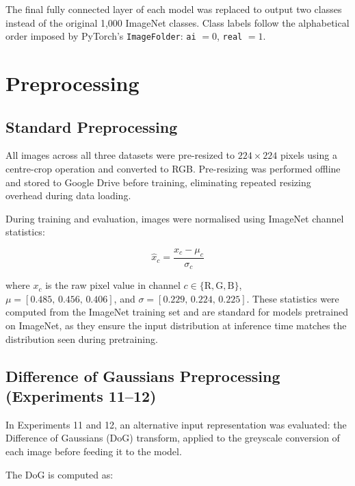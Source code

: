 The final fully connected layer of each model was replaced to output two classes instead of the
original 1,000 ImageNet classes. Class labels follow the alphabetical order imposed by PyTorch's
\texttt{ImageFolder}: \texttt{ai} $= 0$, \texttt{real} $= 1$.


\section{Preprocessing}
\label{sec:preprocessing}

\subsection{Standard Preprocessing}
\label{sec:standard_preprocessing}

All images across all three datasets were pre-resized to $224 \times 224$ pixels using a
centre-crop operation and converted to RGB. Pre-resizing was performed offline and stored to
Google Drive before training, eliminating repeated resizing overhead during data loading.

During training and evaluation, images were normalised using ImageNet channel statistics:

\begin{equation}
  \hat{x}_c = \frac{x_c - \mu_c}{\sigma_c}
  \label{eq:normalisation}
\end{equation}

where $x_c$ is the raw pixel value in channel $c \in \{\text{R}, \text{G}, \text{B}\}$,
$\mu = [0.485,\, 0.456,\, 0.406]$, and $\sigma = [0.229,\, 0.224,\, 0.225]$. These statistics
were computed from the ImageNet training set and are standard for models pretrained on ImageNet,
as they ensure the input distribution at inference time matches the distribution seen during
pretraining.

\subsection{Difference of Gaussians Preprocessing (Experiments 11--12)}
\label{sec:dog_preprocessing}

In Experiments 11 and 12, an alternative input representation was evaluated: the Difference of
Gaussians (DoG) transform, applied to the greyscale conversion of each image before feeding it
to the model.

The DoG is computed as:

